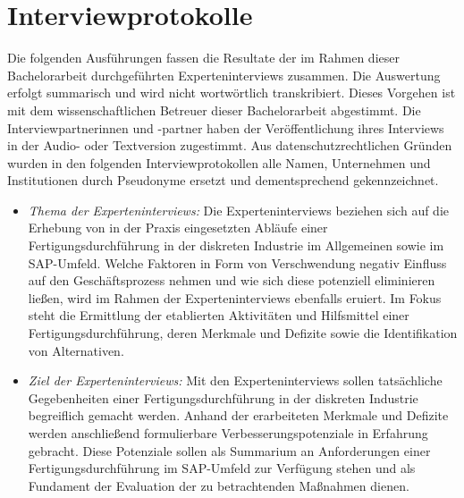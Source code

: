 \chapter{Interviewprotokolle}\label{ah:protokolle}

Die folgenden Ausführungen fassen die Resultate der im Rahmen dieser Bachelorarbeit durchgeführten Experteninterviews zusammen.
Die Auswertung erfolgt summarisch und wird nicht wortwörtlich transkribiert.
Dieses Vorgehen ist mit dem wissenschaftlichen Betreuer dieser Bachelorarbeit abgestimmt.
Die Interviewpartnerinnen und -partner haben der Veröffentlichung ihres Interviews in der Audio- oder Textversion zugestimmt.
Aus datenschutzrechtlichen Gründen wurden in den folgenden Interviewprotokollen alle Namen, Unternehmen und Institutionen durch Pseudonyme ersetzt und dementsprechend gekennzeichnet.

\begin{itemize}
  \item
        \textit{Thema der Experteninterviews:} 
        Die Experteninterviews beziehen sich auf die Erhebung von in der Praxis eingesetzten Abläufe einer Fertigungsdurchführung in der diskreten Industrie im Allgemeinen sowie im SAP-Umfeld.
        Welche Faktoren in Form von Verschwendung negativ Einfluss auf den Geschäftsprozess nehmen und wie sich diese potenziell eliminieren ließen, wird im Rahmen der Experteninterviews ebenfalls eruiert.
        Im Fokus steht die Ermittlung der etablierten Aktivitäten und Hilfsmittel einer Fertigungsdurchführung, deren Merkmale und Defizite sowie die Identifikation von Alternativen.
  \item 
        \textit{Ziel der Experteninterviews:}
        Mit den Experteninterviews sollen tatsächliche Gegebenheiten einer Fertigungsdurchführung in der diskreten Industrie begreiflich gemacht werden. 
        Anhand der erarbeiteten Merkmale und Defizite werden anschließend formulierbare Verbesserungspotenziale in Erfahrung gebracht.
        Diese Potenziale sollen als Summarium an Anforderungen einer Fertigungsdurchführung im SAP-Umfeld zur Verfügung stehen und als Fundament der Evaluation der zu betrachtenden Maßnahmen dienen.
\end{itemize}

\newpage

\newpage

\newpage
